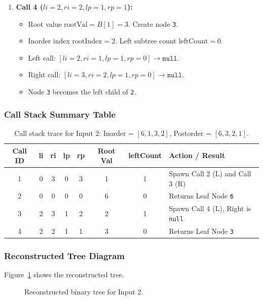 \documentclass[10pt,journal,compsoc,onecolumn]{IEEEtran}
\begin{document}
\begin{enumerate}
    \item \textbf{Call 4 ($li=2, ri=2, lp=1, rp=1$):}
    \begin{itemize}
        \item Root value $\text{rootVal} = B[1] = 3$. Create node \texttt{3}.
        \item Inorder index $\text{rootIndex} = 2$. Left subtree count $\text{leftCount} = 0$.
        \item Left call: $[li=2, ri=1, lp=1, rp=0] \to \texttt{null}$.
        \item Right call: $[li=3, ri=2, lp=1, rp=0] \to \texttt{null}$.
        \item Node \texttt{3} becomes the left child of \texttt{2}.
    \end{itemize}
\end{enumerate}

\subsubsection{Call Stack Summary Table}
\begin{table}[htbp]
\centering
\begin{tabular}{cccccccl}
\toprule
\textbf{Call ID} & \textbf{li} & \textbf{ri} & \textbf{lp} & \textbf{rp} & \textbf{Root Val} & \textbf{leftCount} & \textbf{Action / Result} \\
\midrule
1 & 0 & 3 & 0 & 3 & 1 & 1 & Spawn Call 2 (L) and Call 3 (R) \\
2 & 0 & 0 & 0 & 0 & 6 & 0 & Returns Leaf Node \texttt{6} \\
3 & 2 & 3 & 1 & 2 & 2 & 1 & Spawn Call 4 (L), Right is \texttt{null} \\
4 & 2 & 2 & 1 & 1 & 3 & 0 & Returns Leaf Node \texttt{3} \\
\bottomrule
\end{tabular}
\caption{Call stack trace for Input 2: Inorder = $[6, 1, 3, 2]$, Postorder = $[6, 3, 2, 1]$.}
\label{tab:trace1}
\end{table}

\subsubsection{Reconstructed Tree Diagram}
Figure~\ref{fig:tree1} shows the reconstructed tree.

\begin{figure}[htbp]
\centering
{}
\caption{Reconstructed binary tree for Input 2.}
\label{fig:tree1}
\end{figure}
\end{document}
